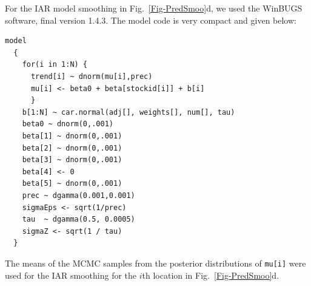 \documentclass[11pt, titlepage]{article}\usepackage[]{graphicx}\usepackage[]{color}
\begin{document}
\begin{spacing}{1.9}
\begin{flushleft}
For the IAR model smoothing in Fig.~\ref{Fig-PredSmoo}d, we used the WinBUGS \citep{Lunn:Thom:Best:Spie:winb:2000} software, final version 1.4.3.  The model code is very compact and given below:
\begin{Verbatim}[baselinestretch=0.75]
model
  {
    for(i in 1:N) {
      trend[i] ~ dnorm(mu[i],prec)
      mu[i] <- beta0 + beta[stockid[i]] + b[i]
	  }
    b[1:N] ~ car.normal(adj[], weights[], num[], tau)
    beta0 ~ dnorm(0,.001)
    beta[1] ~ dnorm(0,.001)
    beta[2] ~ dnorm(0,.001)
    beta[3] ~ dnorm(0,.001)
    beta[4] <- 0
    beta[5] ~ dnorm(0,.001)
    prec ~ dgamma(0.001,0.001)
    sigmaEps <- sqrt(1/prec)
    tau  ~ dgamma(0.5, 0.0005) 
    sigmaZ <- sqrt(1 / tau)		
  }
\end{Verbatim}
The means of the MCMC samples from the posterior distributions of \texttt{mu[i]} were used for the IAR smoothing for the $i$th location in Fig.~\ref{Fig-PredSmoo}d.


\end{flushleft}
\end{spacing}
\end{document}

